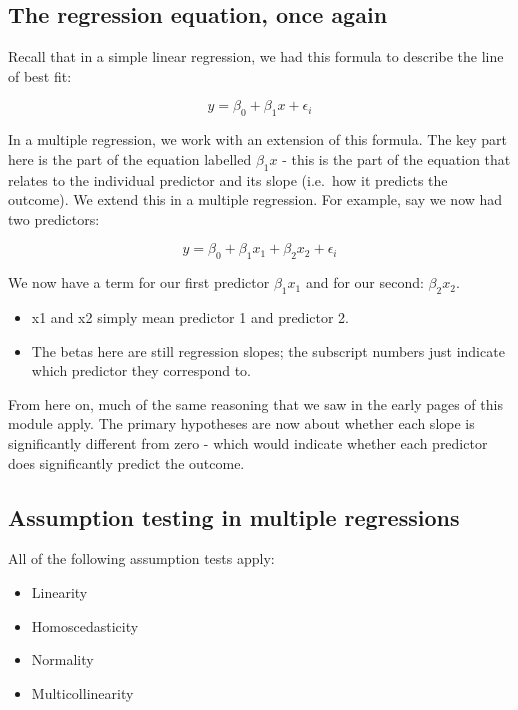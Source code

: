 \documentclass[
]{book}
\providecommand{\tightlist}{%
  \setlength{\itemsep}{0pt}\setlength{\parskip}{0pt}}
\begin{document}
\hypertarget{the-regression-equation-once-again}{%
\subsection{The regression equation, once again}\label{the-regression-equation-once-again}}

Recall that in a simple linear regression, we had this formula to describe the line of best fit:

\[
y = \beta_0 + \beta_1x + \epsilon_i
\]

In a multiple regression, we work with an extension of this formula. The key part here is the part of the equation labelled \(\beta_1x\) - this is the part of the equation that relates to the individual predictor and its slope (i.e.~how it predicts the outcome). We extend this in a multiple regression. For example, say we now had two predictors:

\[
y = \beta_0 + \beta_1x_1 +\beta_2x_2 + \epsilon_i
\]

We now have a term for our first predictor \(\beta_1x_1\) and for our second: \(\beta_2x_2\).

\begin{itemize}
\tightlist
\item
  x1 and x2 simply mean predictor 1 and predictor 2.
\item
  The betas here are still regression slopes; the subscript numbers just indicate which predictor they correspond to.
\end{itemize}

From here on, much of the same reasoning that we saw in the early pages of this module apply. The primary hypotheses are now about whether each slope is significantly different from zero - which would indicate whether each predictor does significantly predict the outcome.

\hypertarget{assumption-testing-in-multiple-regressions}{%
\subsection{Assumption testing in multiple regressions}\label{assumption-testing-in-multiple-regressions}}

All of the following assumption tests apply:

\begin{itemize}
\tightlist
\item
  Linearity
\item
  Homoscedasticity
\item
  Normality
\item
  Multicollinearity
\end{itemize}
\end{document}
